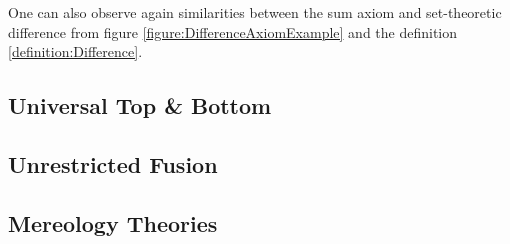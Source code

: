 One can also observe again similarities between the sum axiom and set-theoretic difference from figure \ref{figure:DifferenceAxiomExample} and the definition \ref{definition:Difference}.


\subsection{Universal Top \& Bottom}
\label{subsection:UniversalTopAndBottom}


\subsection{Unrestricted Fusion}
\label{subsection:UnrestrictedFusion}

\subsection{Mereology Theories}
\label{subsection:MereologyTheories}